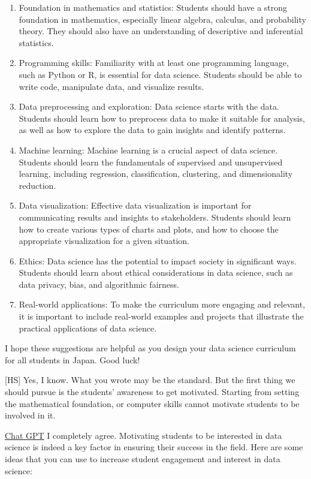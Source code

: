 \documentclass[
]{book}
\providecommand{\tightlist}{%
  \setlength{\itemsep}{0pt}\setlength{\parskip}{0pt}}
\theoremstyle{definition}
\theoremstyle{definition}
\theoremstyle{definition}
\theoremstyle{definition}
\theoremstyle{remark}
\begin{document}
\begin{enumerate}
\def\labelenumi{\arabic{enumi}.}
\tightlist
\item
  Foundation in mathematics and statistics: Students should have a strong foundation in mathematics, especially linear algebra, calculus, and probability theory. They should also have an understanding of descriptive and inferential statistics.
\item
  Programming skills: Familiarity with at least one programming language, such as Python or R, is essential for data science. Students should be able to write code, manipulate data, and visualize results.
\item
  Data preprocessing and exploration: Data science starts with the data. Students should learn how to preprocess data to make it suitable for analysis, as well as how to explore the data to gain insights and identify patterns.
\item
  Machine learning: Machine learning is a crucial aspect of data science. Students should learn the fundamentals of supervised and unsupervised learning, including regression, classification, clustering, and dimensionality reduction.
\item
  Data visualization: Effective data visualization is important for communicating results and insights to stakeholders. Students should learn how to create various types of charts and plots, and how to choose the appropriate visualization for a given situation.
\item
  Ethics: Data science has the potential to impact society in significant ways. Students should learn about ethical considerations in data science, such as data privacy, bias, and algorithmic fairness.
\item
  Real-world applications: To make the curriculum more engaging and relevant, it is important to include real-world examples and projects that illustrate the practical applications of data science.
\end{enumerate}

I hope these suggestions are helpful as you design your data science curriculum for all students in Japan. Good luck!

{[}HS{]} Yes, I know. What you wrote may be the standard. But the first thing we should pursue is the students' awareness to get motivated. Starting from setting the mathematical foundation, or computer skills cannot motivate students to be involved in it.

\protect\hyperlink{chatgpt}{Chat GPT} I completely agree. Motivating students to be interested in data science is indeed a key factor in ensuring their success in the field. Here are some ideas that you can use to increase student engagement and interest in data science:
\end{document}
